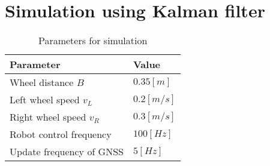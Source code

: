 \documentclass[a4paper]{article}
\begin{document}
\section{Simulation using Kalman filter}
%
%
%

\begin{table}[H]
    \caption{Parameters for simulation}
    \label{table:table1}
    \centering
    \begin{tabular}{ll}
        \hline
        Parameter & Value \\
        \hline \hline
        Wheel distance \(B\) & \(0.35[m]\) \\
        Left wheel speed \(v_L\) & \(0.2 [m/s]\) \\
        Right wheel speed \(v_R\) & \(0.3 [m/s]\) \\
        Robot control frequency & \(100 [Hz]\) \\
        Update frequency of GNSS & \(5 [Hz]\) \\
       \hline
    \end{tabular}
\end{table}

\end{document}
